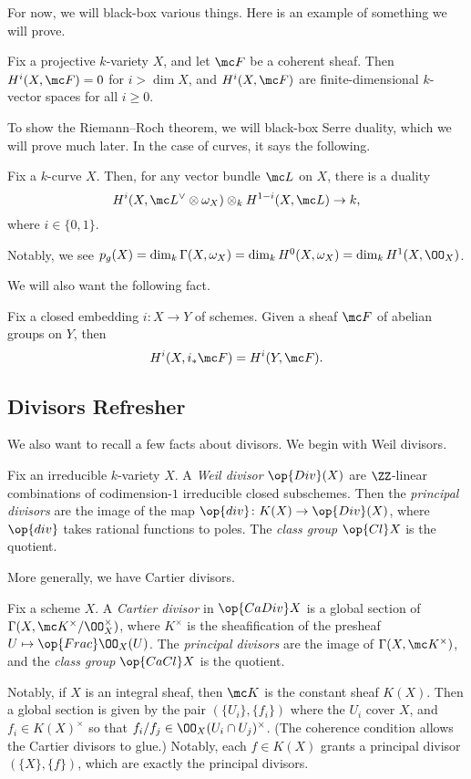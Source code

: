 \documentclass[../notes.tex]{subfiles}
\begin{document}
For now, we will black-box various things. Here is an example of something we will prove.
\begin{proposition}
	Fix a projective $k$-variety $X$, and let $\mc F$ be a coherent sheaf. Then $H^i(X,\mc F)=0$ for $i>\dim X$, and $H^i(X,\mc F)$ are finite-dimensional $k$-vector spaces for all $i\ge0$.
\end{proposition}
To show the Riemann--Roch theorem, we will black-box Serre duality, which we will prove much later. In the case of curves, it says the following.
\begin{theorem}
	Fix a $k$-curve $X$. Then, for any vector bundle $\mc L$ on $X$, there is a duality
	\[H^i(X,\mc L^\lor\otimes\omega_X)\otimes_kH^{1-i}(X,\mc L)\to k,\]
	where $i\in\{0,1\}$.
\end{theorem}
\begin{remark}
	Notably, we see $p_g(X)=\dim_k\Gamma(X,\omega_X)=\dim_kH^0(X,\omega_X)=\dim_kH^1(X,\OO_X)$.
\end{remark}
We will also want the following fact.
\begin{proposition}
	Fix a closed embedding $i\colon X\to Y$ of schemes. Given a sheaf $\mc F$ of abelian groups on $Y$, then
	\[H^i(X,i_*\mc F)=H^i(Y,\mc F).\]
\end{proposition}

\subsection{Divisors Refresher}
We also want to recall a few facts about divisors. We begin with Weil divisors.
\begin{definition}
	Fix an irreducible $k$-variety $X$. A \textit{Weil divisor} $\op{Div}(X)$ are $\ZZ$-linear combinations of codimension-$1$ irreducible closed subschemes. Then the \textit{principal divisors} are the image of the map $\op{div}\colon K(X)\to\op{Div}(X)$, where $\op{div}$ takes rational functions to poles. The \textit{class group} $\op{Cl}X$ is the quotient.
\end{definition}
More generally, we have Cartier divisors.
\begin{definition}
	Fix a scheme $X$. A \textit{Cartier divisor} in $\op{CaDiv}X$ is a global section of $\Gamma(X,\mc K^\times/\OO_X^\times)$, where $K^\times$ is the sheafification of the presheaf $U\mapsto\op{Frac}\OO_X(U)$. The \textit{principal divisors} are the image of $\Gamma(X,\mc K^\times)$, and the \textit{class group} $\op{CaCl}X$ is the quotient.
\end{definition}
Notably, if $X$ is an integral sheaf, then $\mc K$ is the constant sheaf $K(X)$. Then a global section is given by the pair $(\{U_i\},\{f_i\})$ where the $U_i$ cover $X$, and $f_i\in K(X)^\times$ so that $f_i/f_j\in\OO_X(U_i\cap U_j)^\times$. (The coherence condition allows the Cartier divisors to glue.) Notably, each $f\in K(X)$ grants a principal divisor $(\{X\},\{f\})$, which are exactly the principal divisors.
\end{document}
